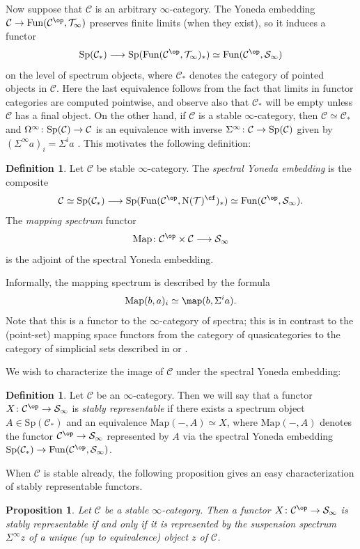 \documentclass{amsart}
\renewcommand{\to}{\mathchoice{\longrightarrow}{\rightarrow}{\rightarrow}{\rightarrow}}
\let\catsymbfont\mathcal
\newcommand{\aC}{{\catsymbfont{C}}}
\newcommand{\aS}{{\catsymbfont{S}}}
\newcommand{\aT}{{\catsymbfont{T}}}
\newcommand{\C}{\catsymbfont{C}}
\newcommand{\N}{\mathrm{N}}
\newcommand{\Fun}{\mathrm{Fun}} %
\newcommand{\Map}{\mathrm{Map}}%
\newcommand{\ispec}{\aS_{\infty}}
\newcommand{\Spec}{\mathrm{Sp}}%
\renewcommand{\i}{\infty}
\numberwithin{equation}{section}
\newtheorem{proposition}[equation]{Proposition}
\theoremstyle{definition}
\newtheorem{definition}[equation]{Definition}
\begin{document}
Now suppose that $\C$ is an arbitrary $\infty$-category. The Yoneda
embedding $\C\to\Fun(\C^{\op},\aT_\i)$ preserves finite limits (when they
exist), so it induces a functor 
\[
\Spec(\C_*)\to\Spec(\Fun(\C^{\op},\aT_\i)_*)\simeq\Fun(\C^{\op},\ispec)
\]
on the level of spectrum objects, where $\C_*$ denotes the category of
pointed objects in $\C$.  Here the last equivalence follows
from the fact that limits in functor categories are computed
pointwise, and observe also that $\C_*$ will be empty unless $\C$ has
a final object. 
On the other hand, if $\C$ is a stable $\i$-category, then
$\C\simeq\C_*$ and $\Omega^\i \colon \Spec(\C)\to\C$ is an equivalence
with inverse $\Sigma^\i \colon \C\to\Spec(\C)$ given by $(\Sigma^\i
a)_i=\Sigma^i a$ \cite[1.4.2.20]{HAG}. 
This motivates the following definition:

\begin{definition}\label{defn:mappingspectrum}
Let $\aC$ be stable $\i$-category.
The {\em spectral Yoneda embedding} is the composite
\[
\C\simeq\Spec(\C_*)\to\Spec(\Fun(\C^{\op},\N(\aT)^{\cf})_*)\simeq\Fun(\C^{\op},\ispec).
\]
The {\em mapping spectrum} functor
\[
\Map\colon \C^{\op}\times\C\to \ispec
\]
is the adjoint of the spectral Yoneda embedding.
\end{definition}

Informally, the mapping spectrum is described by the formula
\[
\Map(b,a)_i\simeq\map(b,\Sigma^i a).
\]
Note that this is a functor to the $\i$-category of spectra;
this is in contrast to the (point-set) mapping space functors from the
category of quasicategories to the category of simplicial sets described
in \cite[1.2.2]{HTT} or \cite{DuggerSpivak}.

We wish to characterize the image of $\aC$ under the spectral Yoneda
embedding:

\begin{definition}
Let $\C$ be an $\i$-category.  Then we will say that a functor
$X\colon\C^{\op}\to\ispec$ is {\em stably representable} if there exists a
spectrum object $A\in\Spec(\C_*)$ and an equivalence $\Map(-,A)\simeq
X$, where $\Map(-,A)$ denotes the functor $\C^{\op}\to\ispec$
represented by $A$ via the spectral Yoneda embedding
$\Spec(\C_*)\to\Fun(\C^{\op},\ispec)$. 
\end{definition}

When $\C$ is stable already, the following proposition gives an easy
characterization of stably representable functors.


\begin{proposition}
Let $\C$ be a stable $\i$-category.  Then a functor
$X\colon \C^{\op}\to\ispec$ is stably representable if and only if it is
represented by the suspension spectrum $\Sigma^\i z$ of a unique (up
to equivalence) object $z$ of $\C$. 
\end{proposition}
\end{document}
